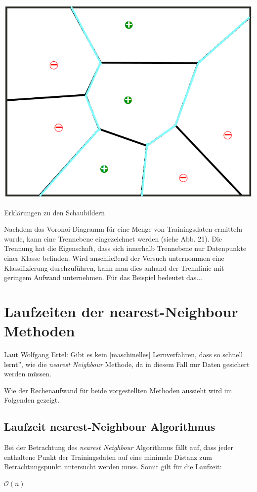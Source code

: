 \documentclass[fontsize=11pt]{scrartcl}
\newenvironment{Figure}
  {\par\medskip\noindent\minipage{\linewidth}}
  {\endminipage\par\medskip}
\begin{document}
            \begin{Figure}
                \includegraphics[width=.4\linewidth]{vor3.png}
            \end{Figure}
            
                        
            Erklärungen zu den Schaubildern\par
            Nachdem das Voronoi-Diagramm für eine Menge von Trainingsdaten ermitteln wurde, kann eine Trennebene eingezeichnet werden (siehe Abb. 21). Die Trennung hat die Eigenschaft, dass sich innerhalb Trennebene nur Datenpunkte einer Klasse befinden. Wird anschließend der Versuch unternommen eine Klassifizierung durchzuführen, kann man dies anhand der Trennlinie mit geringem Aufwand unternehmen. Für das Beispiel bedeutet das...
                         
        \section{Laufzeiten der nearest-Neighbour Methoden}
            Laut Wolfgang Ertel: \glqq Gibt es kein [maschinelles] Lernverfahren, dass so schnell lernt”\cite{ertel2016_p213}, wie die \emph{nearest Neighbour} Methode, da in diesem Fall nur Daten gesichert werden müssen.\par
            Wie der Rechenaufwand für beide vorgestellten Methoden aussieht wird im Folgenden gezeigt.
                        
            \subsection{Laufzeit nearest-Neighbour Algorithmus}
                Bei der Betrachtung des \emph{nearest Neighbour} Algorithmus fällt auf, dass jeder enthaltene Punkt der Trainingsdaten auf eine minimale Distanz zum Betrachtungspunkt untersucht werden muss. Somit gilt für die Laufzeit:\par
              \centering  $\mathcal{O}(n)$\par   
            
\end{document}
